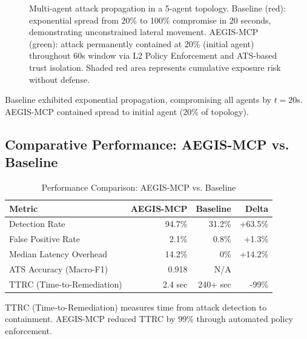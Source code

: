 \documentclass[12pt,twocolumn,journal]{IEEEtran}
\begin{document}
\begin{figure}[!t]
\caption{Multi-agent attack propagation in a 5-agent topology. Baseline (red): exponential spread from 20\% to 100\% compromise in 20 seconds, demonstrating unconstrained lateral movement. AEGIS-MCP (green): attack permanently contained at 20\% (initial agent) throughout 60s window via L2 Policy Enforcement and ATS-based trust isolation. Shaded red area represents cumulative exposure risk without defense.}
\label{fig:propagation}
\end{figure}

Baseline exhibited exponential propagation, compromising all agents by $t=20$s. AEGIS-MCP contained spread to initial agent ($20\%$ of topology).

\subsection{Comparative Performance: AEGIS-MCP vs. Baseline}

\begin{table}[h]
\centering
\caption{Performance Comparison: AEGIS-MCP vs. Baseline}
\label{tab:comparison}
\small
\begin{tabular}{p{2.2cm}|r|r|r}
\toprule
\textbf{Metric} & \textbf{AEGIS-MCP} & \textbf{Baseline} & \textbf{Delta} \\
\midrule
Detection Rate & 94.7\% & 31.2\% & +63.5\% \\
False Positive Rate & 2.1\% & 0.8\% & +1.3\% \\
Median Latency Overhead & 14.2\% & 0\% & +14.2\% \\
ATS Accuracy (Macro-F1) & 0.918 & N/A &   \\
TTRC (Time-to-Remediation) & 2.4 sec & 240+ sec & -99\% \\
\bottomrule
\end{tabular}
\end{table}

TTRC (Time-to-Remediation) measures time from attack detection to containment. AEGIS-MCP reduced TTRC by 99\% through automated policy enforcement.
\end{document}
